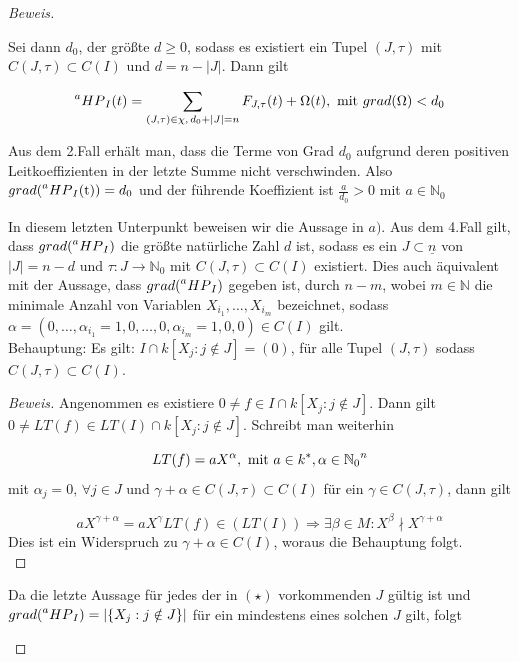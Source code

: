 \documentclass{article}
\newcommand*{\indx}[2]{{#1}_{#2}}
\newcommand*{\potx}[2]{{#1}^{#2}}
\newcommand*{\N}{\mathbb{N}_0}
\newcommand*{\hp}[1]{$\prescript{a}{}{HP}_{#1}$}
\begin{document}
\begin{proof}[Beweis]
\begin{compactenum}
		
		Sei dann $\indx{d}{0}$, der größte $d\geq0$, sodass es existiert ein Tupel $(J,\tau)$ mit $C(J,\tau)\subset C(I)$ und $d=n-|J|$. Dann gilt
		
		\begin{displaymath}
		\textnormal{\hp{I}}(t)=\sum\limits_{(J,\tau)\in \chi,\, \indx{d}{0}+|J|=n}{\indx{F}{J,\tau}(t)} +\Omega(t), \textnormal{ mit } grad(\Omega)<\indx{d}{0}\\
		\end{displaymath}
		
		Aus dem 2.Fall erhält man, dass die Terme von Grad $\indx{d}{0}$ aufgrund deren positiven Leitkoeffizienten in der letzte Summe nicht verschwinden. Also $grad(\textnormal{\hp{I}(t)})=\indx{d}{0}$ und der führende Koeffizient ist $\frac{a}{\indx{d}{0}}>0$ mit $a\in\N$\\
		
		\item In diesem letzten Unterpunkt beweisen wir die Aussage in $a)$. Aus dem 4.Fall gilt, dass $grad(\textnormal{\hp{I}})$ die größte natürliche Zahl $d$ ist, sodass es ein $J\subset\underline{n}$ von $|J|=n-d$ und $\tau: J\rightarrow\N$ mit $C(J,\tau)\subset C(I)$  existiert. Dies auch äquivalent mit der Aussage, dass $grad(\textnormal{\hp{I}})$ gegeben ist, durch $n-m$, wobei $m\in\mathbb{N}$ die minimale Anzahl von Variablen $\indx{X}{\indx{i}{1}},\ldots,\indx{X}{\indx{i}{m}}$ bezeichnet, sodass\\ $\alpha=(0,\ldots,\indx{\alpha}{\indx{i}{1}}=1,0,\ldots,0,\indx{\alpha}{\indx{i}{m}}=1,0,0)\in C(I)$ gilt.\\
		
		Behauptung: Es gilt: $I\cap k\left[\indx{X}{j}:j\notin J\right]={(0)}$, für alle Tupel $(J,\tau)$ sodass $C(J,\tau)\subset C(I)$.\\
		
		\begin{proof}[Beweis]
			Angenommen es existiere $ 0\neq f\in I\cap k\left[\indx{X}{j}:j\notin J\right]$. Dann gilt 
			$ 0\neq LT(f)\in LT(I)\cap k\left[\indx{X}{j}:j\notin J\right]$. Schreibt man weiterhin
			
			\begin{displaymath}
			LT(f)=a\potx{X}{\alpha}, \textnormal{ mit } a\in\potx{k}{*}, \alpha\in\potx{\N}{n} 
			\end{displaymath}
			mit  $\indx{\alpha}{j}=0, \,\forall j\in J$ und $\gamma+\alpha \in C(J,\tau)\subset C(I)$ für ein $\gamma\in C(J,\tau)$, dann gilt 
			
			\begin{displaymath}
			a\potx{X}{\gamma+\alpha}=a\potx{X}{\gamma}LT(f)\in(LT(I))\Rightarrow\exists\beta\in M:\potx{X}{\beta}\nmid\potx{X}{\gamma+\alpha}
			\end{displaymath}
			Dies ist  ein Widerspruch zu $\gamma+\alpha\in C(I)$, woraus die Behauptung folgt. \\
		\end{proof} 
		Da die letzte Aussage für jedes der in $(\star)$ vorkommenden $J$ gültig ist und $grad(\textnormal{\hp{I}})=\left|\{\indx{X}{j}:j\notin J\}\right|$ für ein mindestens eines solchen $J$ gilt, folgt
		

\end{compactenum}
\end{proof}
\end{document}
